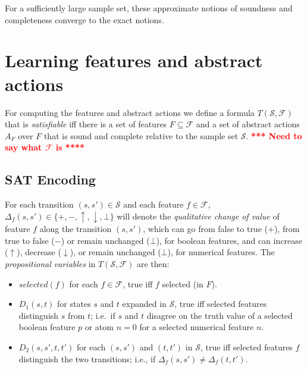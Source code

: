 \documentclass[letterpaper]{article} %
\newcommand{\Omit}[1]{}
\newcommand{\F}{\mathcal{F}}
\renewcommand{\S}{\mathcal{S}}
\begin{document}
For a sufficiently large sample set, these approximate notions of soundness and completeness
converge to the exact notions. 


\section{Learning  features and  abstract actions}

For computing the features and abstract actions we define a formula
$T(\S,\F)$ that is \emph{satisfiable} iff there is a set of
features $F \subseteq \F$ and a set of abstract actions $A_F$
over $F$ that is sound and complete relative to the sample set
$\S$.
\textcolor{red}{\bf **** Need to say what $\F$ is ****}

\Omit{The  sets  $F$ and $A_F$ can then be read off from any satisfying
  assignment. Later we will add weights to so me of the clauses to establish
  a preference over these assignments (e.g., for  minimizing $|F|$).
}


\subsection{SAT Encoding}

For each transition  $(s, s') \in \S$ and each feature $f \in \F$,
$\Delta_f(s, s') \in \{+, -, \uparrow, \downarrow, \bot\}$ will denote the
\emph{qualitative change of value} of feature $f$ along the transition $(s, s')$,
which can go from false to true ($+$), from true to false ($-$) or remain
unchanged ($\bot$), for boolean features, and can increase ($\uparrow$),
decrease ($\downarrow$), or remain unchanged ($\bot$), for numerical features.
The \emph{propositional variables} in $T(\S,\F)$ are then:
\begin{itemize}
  \item $selected(f)$ for each $f \in \F$, true iff $f$ selected (in $F$).
  \item $D_1(s,t)$ for states $s$ and $t$ expanded in $\S$,  true iff
    selected features distinguish $s$ from $t$; i.e.\ if $s$ and $t$ disagree
    on the truth value of a selected boolean feature $p$ or atom $n=0$ for a
    selected numerical feature $n$.
  \item $D_2(s, s', t, t')$ for each $(s, s')$ and $(t, t')$ in $\S$,
    true iff selected features $f$ distinguish the two transitions; i.e., if
    $\Delta_f(s, s')\not=\Delta_f(t,t')$. 
\end{itemize}
\end{document}
